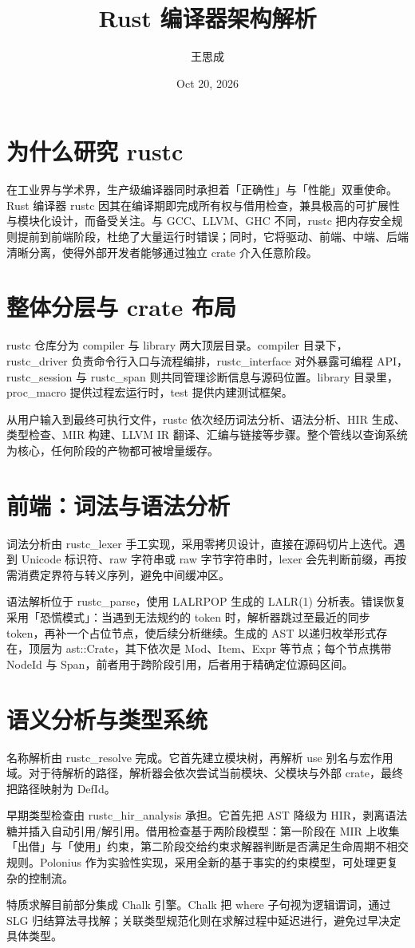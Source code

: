 \title{Rust 编译器架构解析}
\author{王思成}
\date{Oct 20, 2026}
\maketitle
\chapter{为什么研究 rustc}
在工业界与学术界，生产级编译器同时承担着「正确性」与「性能」双重使命。Rust 编译器 rustc 因其在编译期即完成所有权与借用检查，兼具极高的可扩展性与模块化设计，而备受关注。与 GCC、LLVM、GHC 不同，rustc 把内存安全规则提前到前端阶段，杜绝了大量运行时错误；同时，它将驱动、前端、中端、后端清晰分离，使得外部开发者能够通过独立 crate 介入任意阶段。\par
\chapter{整体分层与 crate 布局}
rustc 仓库分为 compiler 与 library 两大顶层目录。compiler 目录下，rustc\_{}driver 负责命令行入口与流程编排，rustc\_{}interface 对外暴露可编程 API，rustc\_{}session 与 rustc\_{}span 则共同管理诊断信息与源码位置。library 目录里，proc\_{}macro 提供过程宏运行时，test 提供内建测试框架。\par
从用户输入到最终可执行文件，rustc 依次经历词法分析、语法分析、HIR 生成、类型检查、MIR 构建、LLVM IR 翻译、汇编与链接等步骤。整个管线以查询系统为核心，任何阶段的产物都可被增量缓存。\par
\chapter{前端：词法与语法分析}
词法分析由 rustc\_{}lexer 手工实现，采用零拷贝设计，直接在源码切片上迭代。遇到 Unicode 标识符、raw 字符串或 raw 字节字符串时，lexer 会先判断前缀，再按需消费定界符与转义序列，避免中间缓冲区。\par
语法解析位于 rustc\_{}parse，使用 LALRPOP 生成的 LALR(1) 分析表。错误恢复采用「恐慌模式」：当遇到无法规约的 token 时，解析器跳过至最近的同步 token，再补一个占位节点，使后续分析继续。生成的 AST 以递归枚举形式存在，顶层为 ast::Crate，其下依次是 Mod、Item、Expr 等节点；每个节点携带 NodeId 与 Span，前者用于跨阶段引用，后者用于精确定位源码区间。\par
\chapter{语义分析与类型系统}
名称解析由 rustc\_{}resolve 完成。它首先建立模块树，再解析 use 别名与宏作用域。对于待解析的路径，解析器会依次尝试当前模块、父模块与外部 crate，最终把路径映射为 DefId。\par
早期类型检查由 rustc\_{}hir\_{}analysis 承担。它首先把 AST 降级为 HIR，剥离语法糖并插入自动引用/解引用。借用检查基于两阶段模型：第一阶段在 MIR 上收集「出借」与「使用」约束，第二阶段交给约束求解器判断是否满足生命周期不相交规则。Polonius 作为实验性实现，采用全新的基于事实的约束模型，可处理更复杂的控制流。\par
特质求解目前部分集成 Chalk 引擎。Chalk 把 where 子句视为逻辑谓词，通过 SLG 归结算法寻找解；关联类型规范化则在求解过程中延迟进行，避免过早决定具体类型。\par
